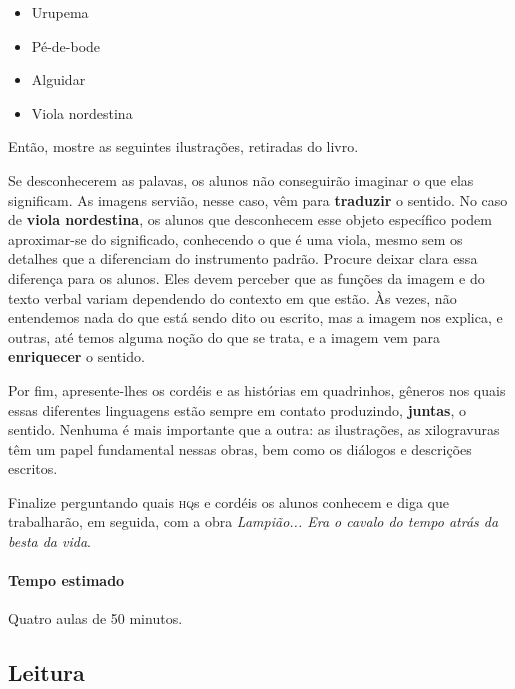 \documentclass[11pt]{extarticle}
\begin{document}
\begin{itemize}
\item Urupema
\item Pé-de-bode
\item Alguidar
\item Viola nordestina
\end{itemize}

Então, mostre as seguintes ilustrações, retiradas do livro.


Se desconhecerem as palavas, os alunos não conseguirão imaginar o que elas significam. As imagens servião, nesse caso, vêm para 
\textbf{traduzir} o sentido. No caso de \textbf{viola nordestina}, os alunos 
que desconhecem esse objeto específico podem aproximar-se do significado, conhecendo o que é uma viola, mesmo sem os detalhes que a diferenciam do instrumento padrão. 
Procure deixar clara essa diferença para os alunos. Eles devem perceber que as funções
da imagem e do texto verbal variam dependendo do contexto em que estão. Às vezes, 
não entendemos nada do que está sendo dito ou escrito, mas a imagem nos explica,
e outras, até temos alguma noção do que se trata, e a imagem vem para \textbf{enriquecer}
o sentido. 


Por fim, apresente-lhes os cordéis e as histórias em quadrinhos, gêneros nos quais 
essas diferentes linguagens estão sempre em contato produzindo, \textbf{juntas},
o sentido. Nenhuma é mais importante que a outra: as ilustrações, as xilogravuras
têm um papel fundamental nessas obras, bem como os diálogos e descrições escritos.

Finalize perguntando quais \textsc{hq}s e cordéis os alunos conhecem e diga que trabalharão, em seguida,
com a obra \textit{Lampião... Era o cavalo do tempo atrás da besta da vida}.

\paragraph{Tempo estimado} Quatro aulas de 50 minutos.

\subsection{Leitura}

\end{document}
